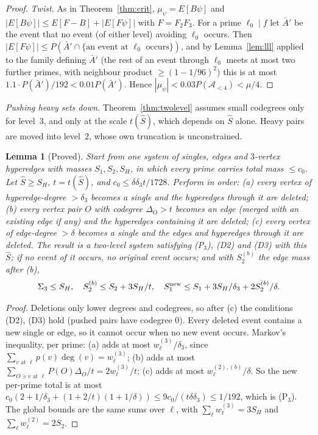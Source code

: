\documentclass[11pt,reqno]{amsart}
\newtheorem{lemma}[theorem]{Lemma}
\theoremstyle{definition}
\begin{document}
\begin{proof}
\emph{Twist.}  As in Theorem~\ref{thm:crit}, $\mu_\psi=E[B\psi]$ and
$|E[B\psi]|\le E[F-B]+|E[F\psi]|$ with $F=F_2F_3$.  For a prime $\ell_0\mid f$ let
$\bar A'$ be the event that no event (of either level) avoiding $\ell_0$ occurs.
Then $|E[F\psi]|\le P(\bar A'\cap\{\text{an event at }\ell_0\text{ occurs}\})$, and by
Lemma~\ref{lem:lll} applied to the family defining $\bar A'$ (the rest of an
event through $\ell_0$ meets at most two further primes, with neighbour product
$\ge(1-1/96)^2$) this is at most $1.1\cdot P(\bar A')/192<0.01P(\bar A')$.  Hence
$|\mu_\psi|<0.03P(\mathcal A_{<4})<\mu/4$.
\end{proof}

\emph{Pushing heavy sets down.}  Theorem~\ref{thm:twolevel} assumes small
codegrees only for level~$3$, and only at the scale $t(\hat S)$, which depends
on $\hat S$ alone.  Heavy pairs are moved into level~$2$, whose own
truncation is unconstrained.

\begin{lemma}[Proved]\label{lem:push}
Start from one system of singles, edges and $3$-vertex hyperedges with masses
$S_1,S_2,S_H$, in which every prime carries total mass $\le c_0$.  Let
$\hat S\ge S_H$, $t=t(\hat S)$, and $c_0\le\delta\delta_3t/1728$.  Perform in
order: \textup{(a)} every vertex of hyperedge-degree $>\delta_3$ becomes a
single and the hyperedges through it are deleted; \textup{(b)} every vertex
pair $O$ with codegree $\Delta_O>t$ becomes an edge \textup{(}merged with an
existing edge if any\textup{)} and the hyperedges containing it are deleted;
\textup{(c)} every vertex of edge-degree $>\delta$ becomes a single and the
edges and hyperedges through it are deleted.  The result is a two-level system
satisfying \textup{(P$_3$)}, \textup{(D2)} and \textup{(D3)} with this $\hat S$;
if no event of it occurs, no original event occurs; and with $S_2^{(b)}$ the
edge mass after \textup{(b)},
\[
 \Sigma_3\le S_H,\quad S_2^{(b)}\le S_2+3S_H/t,\quad
 S_1^{\rm new}\le S_1+3S_H/\delta_3+2S_2^{(b)}/\delta .
\]
\end{lemma}

\begin{proof}
Deletions only lower degrees and codegrees, so after \textup{(c)} the
conditions (D2), (D3) hold (pushed pairs have codegree $0$).  Every deleted
event contains a new single or edge, so it cannot occur when no new event
occurs.  Markov's inequality, per prime: \textup{(a)} adds at most
$w^{(3)}_\ell/\delta_3$, since $\sum_{v\text{ at }\ell}p(v)\deg(v)=w^{(3)}_\ell$;
\textup{(b)} adds at most $\sum_{O\ni v\text{ at }\ell}P(O)\Delta_O/t=2w^{(3)}_\ell/t$;
\textup{(c)} adds at most $w^{(2),(b)}_\ell/\delta$.  So the new per-prime total is
at most $c_0(2+1/\delta_3+(1+2/t)(1+1/\delta))\le9c_0/(t\delta\delta_3)\le1/192$,
which is (P$_3$).  The global bounds are the same sums over $\ell$, with
$\sum_\ell w^{(3)}_\ell=3S_H$ and $\sum_\ell w^{(2)}_\ell=2S_2$.
\end{proof}
\end{document}
